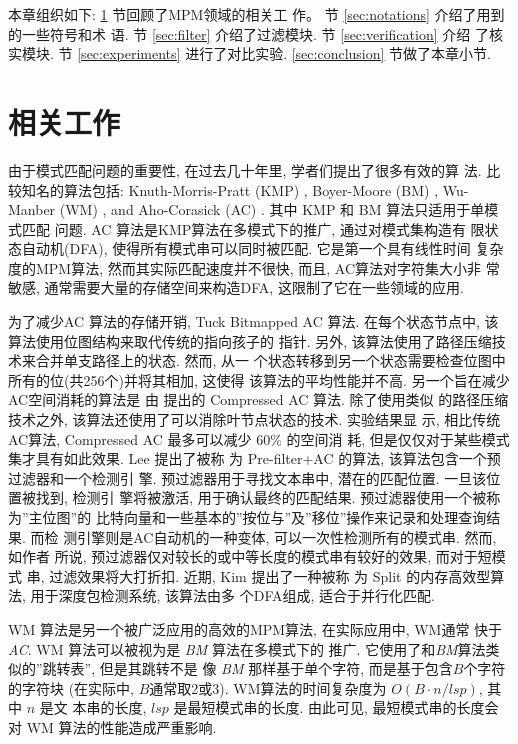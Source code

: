 \documentclass{ws-ijprai}
\begin{document}
本章组织如下: \ref{sec:related works} 节回顾了MPM领域的相关工
作。 节 \ref{sec:notations} 介绍了用到的一些符号和术
语. 节 \ref{sec:filter} 介绍了过滤模块. 节 \ref{sec:verification} 介绍
了核实模块. 节 \ref{sec:experiments} 进行了对比实验.
\ref{sec:conclusion} 节做了本章小节.

\section{相关工作}
\label{sec:related works}

由于模式匹配问题的重要性, 在过去几十年里, 学者们提出了很多有效的算
法. 比较知名的算法包括: Knuth-Morris-Pratt (\textsf{KMP})
\cite{Knuth1977}, Boyer-Moore (\textsf{BM}) \cite{Boyer1977},
Wu-Manber (\textsf{WM}) \cite{Wu1994}, and Aho-Corasick (\textsf{AC})
\cite{Aho1975}. 其中 \textsf{KMP} 和 \textsf{BM} 算法只适用于单模式匹配
问题.  \textsf{AC} 算法是KMP算法在多模式下的推广, 通过对模式集构造有
限状态自动机(DFA), 使得所有模式串可以同时被匹配. 它是第一个具有线性时间
复杂度的MPM算法, 然而其实际匹配速度并不很快, 而且, AC算法对字符集大小非
常敏感, 通常需要大量的存储空间来构造DFA, 这限制了它在一些领域的应用.

为了减少\textsf{AC} 算法的存储开销, Tuck \cite{Tuck2004} {Bitmapped
  AC} 算法. 在每个状态节点中, 该算法使用位图结构来取代传统的指向孩子的
指针. 另外, 该算法使用了路径压缩技术来合并单支路径上的状态. 然而, 从一
个状态转移到另一个状态需要检查位图中所有的位(共256个)并将其相加, 这使得
该算法的平均性能并不高. 另一个旨在减少AC空间消耗的算法是
由 \cite{Bremler2011} 提出的 \textsf{Compressed AC} 算法. 除了使用类似
的路径压缩技术之外, 该算法还使用了可以消除叶节点状态的技术. 实验结果显
示, 相比传统AC算法, \textsf{Compressed AC} 最多可以减少 $60\%$ 的空间消
耗, 但是仅仅对于某些模式集才具有如此效果. Lee \cite{Lee2013} 提出了被称
为 \textsf{Pre-filter+AC} 的算法, 该算法包含一个预过滤器和一个检测引
擎. 预过滤器用于寻找文本串中, 潜在的匹配位置. 一旦该位置被找到, 检测引
擎将被激活, 用于确认最终的匹配结果. 预过滤器使用一个被称为''主位图''的
比特向量和一些基本的''按位与''及''移位''操作来记录和处理查询结果. 而检
测引擎则是AC自动机的一种变体, 可以一次性检测所有的模式串. 然而, 如作者
所说, 预过滤器仅对较长的或中等长度的模式串有较好的效果, 而对于短模式
串, 过滤效果将大打折扣. 近期, Kim \cite{Kim2015} 提出了一种被称
为 \textsf{Split} 的内存高效型算法, 用于深度包检测系统, 该算法由多
个DFA组成, 适合于并行化匹配.

\textsf{WM} 算法是另一个被广泛应用的高效的MPM算法, 在实际应用中, WM通常
快于\emph{AC}. \textsf{WM} 算法可以被视为是 \emph{BM} 算法在多模式下的
推广. 它使用了和\emph{BM}算法类似的''跳转表'', 但是其跳转不是
像 \emph{BM} 那样基于单个字符, 而是基于包含$B$个字符的字符块 (在实际中,
$B$通常取2或3). WM算法的时间复杂度为 $O(B \cdot n/lsp)$, 其中 $n$ 是文
本串的长度, $lsp$ 是最短模式串的长度. 由此可见, 最短模式串的长度会
对 WM 算法的性能造成严重影响.
\end{document}

